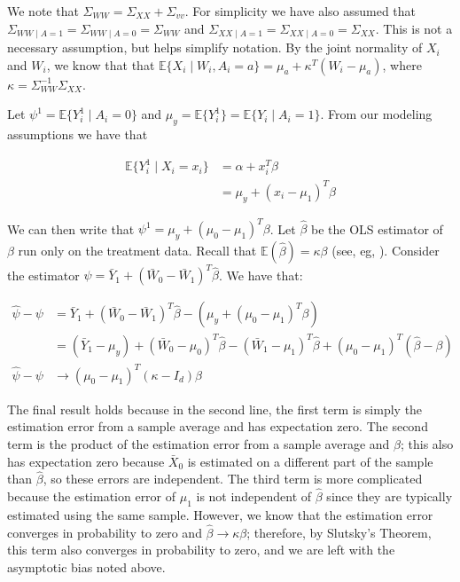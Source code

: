 \documentclass[12pt]{article}
\begin{document}
We note that $\Sigma_{WW} = \Sigma_{XX} + \Sigma_{vv}$. For simplicity we have also assumed that $\Sigma_{WW \mid A = 1} = \Sigma_{WW \mid A = 0} = \Sigma_{WW}$ and $\Sigma_{XX \mid A = 1} = \Sigma_{XX \mid A = 0} = \Sigma_{XX}$. This is not a necessary assumption, but helps simplify notation. By the joint normality of $X_i$ and $W_i$, we know that that $\mathbb{E}\{X_i \mid W_i, A_i = a\} = \mu_a + \kappa^T(W_i - \mu_a)$, where $\kappa = \Sigma_{WW}^{-1}\Sigma_{XX}$.

Let $\psi^1 = \mathbb{E}\{Y_i^1 \mid A_i = 0\}$ and $\mu_y = \mathbb{E}\{Y_i^1\} = \mathbb{E}\{Y_i \mid A_i = 1\}$. From our modeling assumptions we have that

\begin{align*}
    \mathbb{E}\{Y_i^1 \mid X_i = x_i\} &= \alpha + x_i^T\beta \\
    &= \mu_y + (x_i - \mu_1)^T\beta
\end{align*}

We can then write that $\psi^1 = \mu_y + (\mu_0 - \mu_1)^T\beta$. Let $\hat{\beta}$ be the OLS estimator of $\beta$ run only on the treatment data. Recall that $\mathbb{E}(\hat{\beta}) = \kappa\beta$ (see, eg, \cite{gleser1992importance}). Consider the estimator $\hat{\psi} = \bar{Y}_1 + (\bar{W}_0 - \bar{W}_1)^T\hat{\beta}$. We have that: 

\begin{align*}
    \hat{\psi} - \psi &= \bar{Y}_1 + (\bar{W}_0 - \bar{W}_1)^T\hat{\beta} - (\mu_y + (\mu_0 - \mu_1)^T\beta) \\
    &= (\bar{Y}_1 - \mu_y) + (\bar{W}_0 - \mu_0)^T\hat{\beta} - (\bar{W}_1 - \mu_1)^T\hat{\beta} + (\mu_0 - \mu_1)^T(\hat{\beta} - \beta) \\
    \hat{\psi} - \psi &\to (\mu_0 - \mu_1)^T(\kappa - I_d)\beta
\end{align*}

The final result holds because in the second line, the first term is simply the estimation error from a sample average and has expectation zero. The second term is the product of the estimation error from a sample average and $\hat{\beta}$; this also has expectation zero because $\bar{X}_0$ is estimated on a different part of the sample than $\hat{\beta}$, so these errors are independent. The third term is more complicated because the estimation error of $\mu_1$ is not independent of $\hat{\beta}$ since they are typically estimated using the same sample. However, we know that the estimation error converges in probability to zero and $\hat{\beta} \to \kappa\beta$; therefore, by Slutsky's Theorem, this term also converges in probability to zero, and we are left with the asymptotic bias noted above. 
\end{document}

